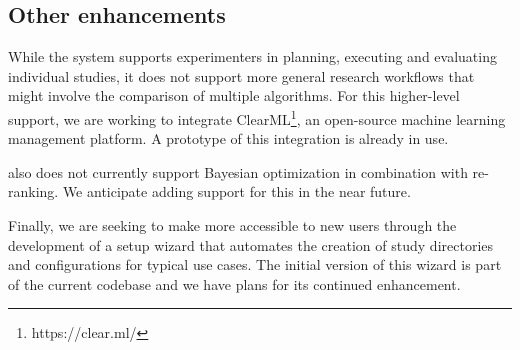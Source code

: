\subsection{Other enhancements}
While the system supports experimenters in planning, executing and evaluating individual studies, it does not support more general research workflows that might involve the comparison of multiple algorithms. For this higher-level support, we are working to integrate ClearML\footnote{https://clear.ml/}, an open-source machine learning management platform. A prototype of this integration is already in use.

\libauto{} also does not currently support Bayesian optimization in combination with re-ranking. We anticipate adding support for this in the near future.  

Finally, we are seeking to make \libauto{} more accessible to new users through the development of a setup wizard that automates the creation of study directories and configurations for typical use cases. The initial version of this wizard is part of the current codebase and we have plans for its continued enhancement. 


